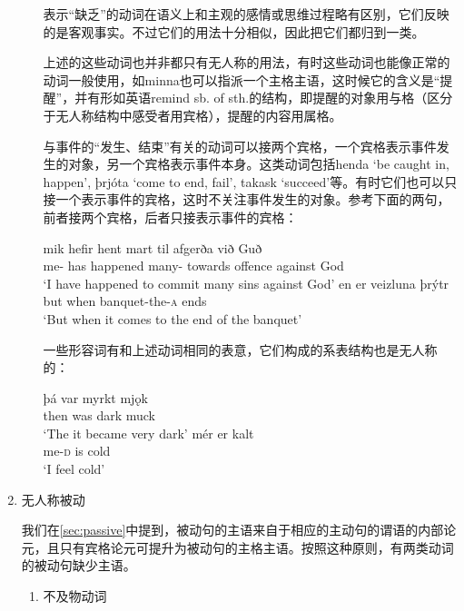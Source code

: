 \begin{enumerate}
\begin{enumerate}
                    表示“缺乏”的动词在语义上和主观的感情或思维过程略有区别，它们反映的是客观事实。不过它们的用法十分相似，因此把它们都归到一类。

                    上述的这些动词也并非都只有无人称的用法，有时这些动词也能像正常的动词一般使用，如minna也可以指派一个主格主语，这时候它的含义是“提醒”，并有形如英语remind sb. of sth.的结构，即提醒的对象用与格（区分于无人称结构中感受者用宾格），提醒的内容用属格。

                    与事件的“发生、结束”有关的动词可以接两个宾格，一个宾格表示事件发生的对象，另一个宾格表示事件本身。这类动词包括henda `be caught in, happen’, þrjóta `come to end, fail’, takask `succeed’等。有时它们也可以只接一个表示事件的宾格，这时不关注事件发生的对象。参考下面的两句，前者接两个宾格，后者只接表示事件的宾格：
                    \begin{exe}
                        \ex \gll
                        mik	hefir	hent	mart	til	afgerða	við	Guð\\
                        me-{{\acc}}	has	happened	many-{\acc} towards	offence	against	God\\
                        \trans `I have happened to commit many sins against God’
                        \ex \gll
                        en	er	veizluna	þrýtr\\
                        but	when	banquet-the-\textsc{a}	ends\\
                        \trans `But when it comes to the end of the banquet’
                    \end{exe}

                    一些形容词有和上述动词相同的表意，它们构成的系表结构也是无人称的：
                    \begin{exe}
                        \ex \gll
                        þá	var	myrkt	mjǫk\\
                        then	was	dark	muck\\
                        \trans `The it became very dark’
                        \ex \gll
                        mér	er	kalt\\
                        me-\textsc{d}	is	cold\\
                        \trans `I feel cold’
                    \end{exe}
          \end{enumerate}

    \item 无人称被动

          我们在\ref{sec:passive}中提到，被动句的主语来自于相应的主动句的谓语的内部论元，且只有宾格论元可提升为被动句的主格主语。按照这种原则，有两类动词的被动句缺少主语。
          \begin{enumerate}
              \setlength{\parindent}{2em}
              \item 不及物动词


\end{enumerate}
\end{enumerate}
